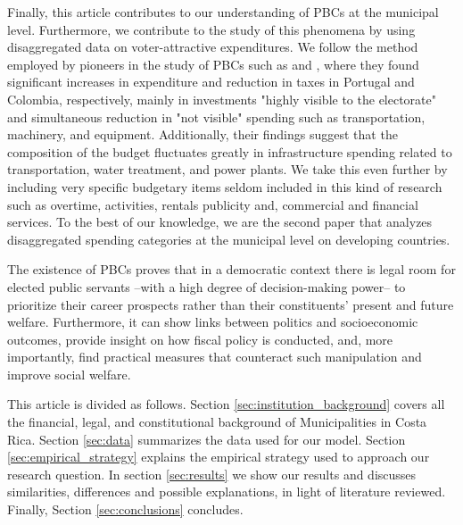 Finally, this article contributes to our understanding of PBCs at the municipal level. Furthermore, we contribute to the study of this phenomena by using disaggregated data on voter-attractive expenditures. We follow the method employed by pioneers in the study of PBCs such as \textcite{veiga2007} and \textcite{drazen2010}, where they found significant increases in expenditure and reduction in taxes in Portugal and Colombia, respectively, mainly in investments "highly visible to the electorate" and simultaneous reduction in "not visible" spending such as transportation, machinery, and equipment. Additionally, their findings suggest that the composition of the budget fluctuates greatly in infrastructure spending related to transportation, water treatment, and power plants. We take this even further by including very specific budgetary items seldom included in this kind of research such as overtime, activities, rentals publicity and, commercial and financial services. To the best of our knowledge, we are the second paper that analyzes disaggregated spending categories at the municipal level on developing countries. 

The existence of PBCs proves that in a democratic context there is legal room for elected public servants --with a high degree of decision-making power-- to prioritize their career prospects rather than their constituents' present and future welfare. Furthermore, it can show links between politics and socioeconomic outcomes, provide insight on how fiscal policy is conducted, and, more importantly, find practical measures that counteract such manipulation and improve social welfare. \parencite{alesina2018,chortareas2016, corvalan2018, setiawan2017}

This article is divided as follows. Section \ref{sec:institution_background} covers all the financial, legal, and constitutional background of Municipalities in Costa Rica. Section \ref{sec:data} summarizes the data used for our model. Section \ref{sec:empirical_strategy} explains the empirical strategy used to approach our research question. In section \ref{sec:results} we show our results and discusses similarities, differences and possible explanations, in light of literature reviewed. Finally, Section \ref{sec:conclusions} concludes. 

